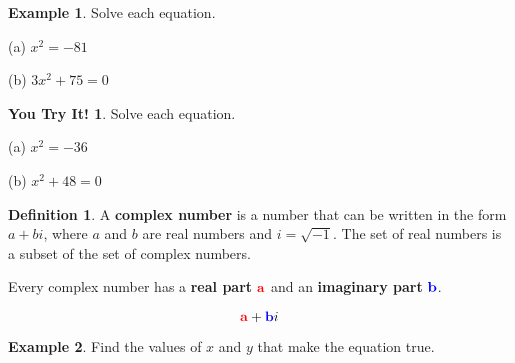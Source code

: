 \documentclass{report}
\theoremstyle{definition}
\newtheorem{example}{\bf Example}
\newtheorem{definition}{\bf Definition}[section]
\newtheorem{youtry}{\textbf{You Try It!}}
\begin{document}
\vspace{0.75cm}

\begin{example}
Solve each equation.
\end{example}

\vspace{-0.25cm}

\begin{minipage}[t]{0.45\linewidth}
(a) $x^2=-81$
\end{minipage}
\hfill
\begin{minipage}[t]{0.45\linewidth}
(b) $3x^2+75=0$
\end{minipage}

\vspace{0.75cm}

\begin{youtry}
Solve each equation.
\end{youtry}

\vspace{-0.25cm}

\begin{minipage}[t]{0.45\linewidth}
(a) $x^2=-36$
\end{minipage}
\hfill
\begin{minipage}[t]{0.45\linewidth}
(b) $x^2+48=0$
\end{minipage}

\vspace{0.75cm}

\begin{definition}
A \textbf{complex number} is a number that can be written in the form $a+bi$, where $a$ and $b$ are real numbers and $i=\sqrt{-1}$. The set of real numbers is a subset of the set of complex numbers.\\

\vspace{-0.75cm}

\noindent Every complex number has a \textbf{real part} $\color{red}\mathbf{a}\color{black}$ and an \textbf{imaginary part} $\color{blue}\mathbf{b}\color{blue}$.

\vspace{-1cm}

\[\Large \color{red}\mathbf{a}\color{black} + \color{blue}\mathbf{b}\color{black}i\]
\end{definition}

\vspace{-1cm}

\begin{example}
Find the values of $x$ and $y$ that make the equation true.
\end{example}
\end{document}

